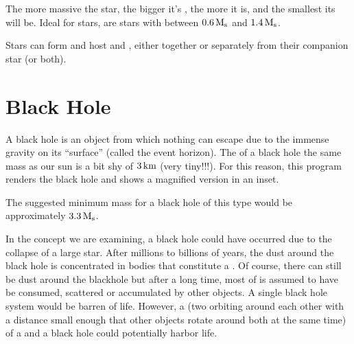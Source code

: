 \documentclass[letterpaper,10pt,english]{sphinxmanual}
\begin{document}
\sphinxAtStartPar
The more massive the star, the bigger it’s {\hyperref[\detokenize{quantities/geometric/radius:id1}]{}}, the more {\hyperref[\detokenize{quantities/surface/emission/luminosity:id1}]{}} it is,
and the smallest its {\hyperref[\detokenize{quantities/life/lifetime:id1}]{}} will be.
Ideal for {\hyperref[\detokenize{quantities/habitability/habitability:id1}]{}} stars, are stars with {\hyperref[\detokenize{quantities/material/mass:id1}]{}} between \(0.6 \, {\rm M_s}\)
and \(1.4 \, {\rm M_s}\).

\sphinxAtStartPar
Stars can form {\hyperref[\detokenize{celestial_systems/binary_system:id1}]{}} and host {\hyperref[\detokenize{celestial_bodies/planet:id1}]{}}
and {\hyperref[\detokenize{celestial_bodies/asteroid_belt:id1}]{}}, either together or separately from their companion star (or both).


\section{Black Hole}
\label{\detokenize{celestial_bodies/black_hole:black-hole}}\label{\detokenize{celestial_bodies/black_hole::doc}}\label{\detokenize{celestial_bodies/black_hole:id1}}
\sphinxAtStartPar
A black hole is an object from which nothing can escape due to the immense gravity on its “surface” (called
the event horizon). The {\hyperref[\detokenize{quantities/geometric/radius:id1}]{}} of a black hole the same mass as our sun is a bit shy
of \(3 \, {\rm km}\) (very tiny!!!). For this reason, this program renders the black hole and shows a magnified version
in an inset.

\sphinxAtStartPar
The suggested minimum mass for a black hole of this type would be approximately \(3.3 \, {\rm M_s}\).

\sphinxAtStartPar
In the concept we are examining, a black hole could have occurred due to the collapse of a large star.
After millions to billions of years, the dust around the black hole is concentrated in bodies that constitute a
{\hyperref[\detokenize{celestial_systems/stellar_system:id1}]{}}. Of course, there can still be dust around the blackhole
but after a long time, most of is assumed to have be consumed, scattered or accumulated by other objects.
A single black hole system would be barren of life. However, a {\hyperref[\detokenize{celestial_systems/binary_system:id1}]{}}
(two {\hyperref[\detokenize{celestial_bodies/star:id1}]{}} orbiting around each other with a distance small enough that other objects rotate around
both at the same time) of a {\hyperref[\detokenize{celestial_bodies/star:id1}]{}} and a black hole could potentially harbor life.
\end{document}
